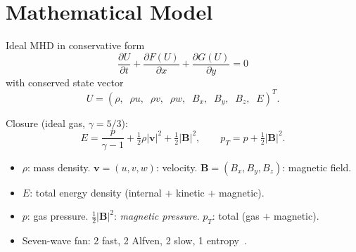 \documentclass[aspectratio=43]{beamer}
\begin{document}
\section{Mathematical Model}

\begin{frame}{Ideal MHD in conservative form}
  \[
  \frac{\partial U}{\partial t} + \frac{\partial F(U)}{\partial x} + \frac{\partial G(U)}{\partial y} = 0
  \]
  with conserved state vector
  \[
  U = (\rho,\;\; \rho u,\;\; \rho v,\;\; \rho w,\;\; B_x,\;\; B_y,\;\; B_z,\;\; E)^{T}.
  \]
  \medskip

  Closure (ideal gas, $\gamma = 5/3$):
  \[
  E = \frac{p}{\gamma - 1} + \tfrac{1}{2}\rho|\mathbf{v}|^{2} + \tfrac{1}{2}|\mathbf{B}|^{2},
  \qquad
  p_T = p + \tfrac{1}{2}|\mathbf{B}|^{2}.
  \]
  \medskip

  \begin{itemize}\small
    \item $\rho$: mass density. $\mathbf{v} = (u,v,w)$: velocity. $\mathbf{B} = (B_x,B_y,B_z)$: magnetic field.
    \item $E$: total energy density (internal $+$ kinetic $+$ magnetic).
    \item $p$: gas pressure. $\tfrac{1}{2}|\mathbf{B}|^{2}$: \emph{magnetic pressure}. $p_T$: total (gas $+$ magnetic).
    \item Seven-wave fan: 2 fast, 2 Alfven, 2 slow, 1 entropy~\cite{brio1988,miyoshi2005}.
  \end{itemize}
\end{frame}
\end{document}
